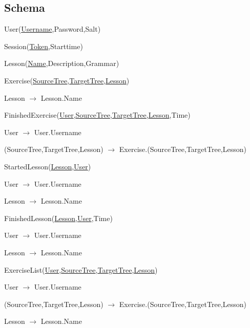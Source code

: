\documentclass{scrartcl}
\begin{document}
\subsection{Schema}
\begin{description}
\item User(\underline{Username},Password,Salt)
\item Session(\underline{Token},Starttime)
\item Lesson(\underline{Name},Description,Grammar)
\item Exercise(\underline{SourceTree},\underline{TargetTree},\underline{Lesson})
  \begin{description}
  \item Lesson $\rightarrow$ Lesson.Name
  \end{description}
\item FinishedExercise(\underline{User},\underline{SourceTree},\underline{TargetTree},\underline{Lesson},Time)
  \begin{description}
  \item User $\rightarrow$ User.Username
  \item (SourceTree,TargetTree,Lesson) $\rightarrow$ Exercise.(SourceTree,TargetTree,Lesson)
  \end{description}
\item StartedLesson(\underline{Lesson},\underline{User})
  \begin{description}
  \item User $\rightarrow$ User.Username
  \item Lesson $\rightarrow$ Lesson.Name
  \end{description}
\item FinishedLesson(\underline{Lesson},\underline{User},Time)
  \begin{description}
  \item User $\rightarrow$ User.Username
  \item Lesson $\rightarrow$ Lesson.Name
  \end{description}
\item ExerciseList(\underline{User},\underline{SourceTree},\underline{TargetTree},\underline{Lesson})
  \begin{description}
  \item User $\rightarrow$ User.Username
  \item (SourceTree,TargetTree,Lesson) $\rightarrow$ Exercise.(SourceTree,TargetTree,Lesson)
  \item Lesson $\rightarrow$ Lesson.Name
  \end{description}
\end{description}
\end{document}
